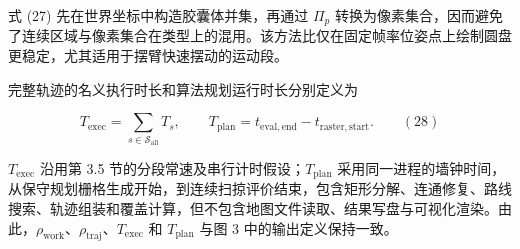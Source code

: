   

式 (27) 先在世界坐标中构造胶囊体并集，再通过 $\Pi_p$ 转换为像素集合，因而避免了连续区域与像素集合在类型上的混用。该方法比仅在固定帧率位姿点上绘制圆盘更稳定，尤其适用于摆臂快速摆动的运动段。

完整轨迹的名义执行时长和算法规划运行时长分别定义为

$$
T_{\mathrm{exec}}=\sum_{s\in\mathcal S_{\mathrm{all}}}T_s,
\qquad
T_{\mathrm{plan}}=t_{\mathrm{eval,end}}-t_{\mathrm{raster,start}}.
\qquad(28)
$$

$T_{\mathrm{exec}}$ 沿用第 3.5 节的分段常速及串行计时假设；$T_{\mathrm{plan}}$ 采用同一进程的墙钟时间，从保守规划栅格生成开始，到连续扫掠评价结束，包含矩形分解、连通修复、路线搜索、轨迹组装和覆盖计算，但不包含地图文件读取、结果写盘与可视化渲染。由此，$\rho_{\mathrm{work}}$、$\rho_{\mathrm{traj}}$、$T_{\mathrm{exec}}$ 和 $T_{\mathrm{plan}}$ 与图 3 中的输出定义保持一致。

  

